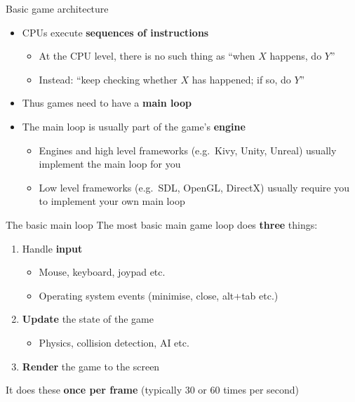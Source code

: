 
\begin{frame}{Basic game architecture}
    \begin{itemize}
        \item CPUs execute \textbf{sequences of instructions} \pause
            \begin{itemize}
                \item At the CPU level, there is no such thing as ``when $X$ happens, do $Y$'' \pause
                \item Instead: ``keep checking whether $X$ has happened; if so, do $Y$'' \pause
            \end{itemize}
        \item Thus games need to have a \textbf{main loop} \pause
        \item The main loop is usually part of the game's \textbf{engine} \pause
            \begin{itemize}
                \item Engines and high level frameworks (e.g.\ Kivy, Unity, Unreal)
                    usually implement the main loop for you \pause
                \item Low level frameworks (e.g.\ SDL, OpenGL, DirectX)
                    usually require you to implement your own main loop
            \end{itemize}
    \end{itemize}
\end{frame}

\begin{frame}{The basic main loop}
    The most basic main game loop does \textbf{three} things: \pause
    \begin{enumerate}
        \item Handle \textbf{input} \pause
            \begin{itemize}
                \item Mouse, keyboard, joypad etc. \pause
                \item Operating system events (minimise, close, alt+tab etc.) \pause
            \end{itemize}
        \item \textbf{Update} the state of the game \pause
            \begin{itemize}
                \item Physics, collision detection, AI etc. \pause
            \end{itemize}
        \item \textbf{Render} the game to the screen \pause
    \end{enumerate}
    It does these \textbf{once per frame} (typically 30 or 60 times per second) \pause
\end{frame}

